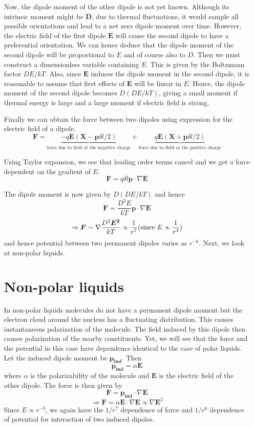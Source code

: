 \documentclass[11pt, letterpaper]{article}
\begin{document}
Now, the dipole moment of the other dipole is not yet known. Although its intrinsic moment might be $\bm{D}$, due to thermal fluctuations, it would sample all possible orientations and lead to a net zero dipole moment over time. However, the electric field of the first dipole $\bm{E}$ will cause the second dipole to have a preferential orientation. We can hence deduce that the dipole moment of the second dipole will be proportional to $E$ and of course also to $D$. Then we must construct a dimensionless variable containing $E$. This is given by the Boltzmann factor $DE/kT$. Also, since $\bm{E}$ induces the dipole moment in the second dipole, it is reasonable to assume that first effects of $\bm{E}$ will be linear in $E$. Hence, the dipole moment of the second dipole becomes $D(DE/kT)$, giving a small moment if thermal energy is large and a large moment if electric field is strong. 

Finally we can obtain the force between two dipoles using expression for the electric field of a dipole. 
$$
\bm{F} = \underbrace{-q\bm{E}(\bm{X} - \bm{p}\delta l /2)}_{\text{force due to field at the negative charge}} + \underbrace{q\bm{E}(\bm{X} + \bm{p}\delta l /2)}_{\text{force due to field at the positive charge}}
$$

Using Taylor expansion, we see that leading order terms cancel and we get a force dependent on the gradient of $E$. 
$$
\bm{F} = q\delta l \bm{p}\cdot\nabla\bm{E}
$$

The dipole moment is now given by  $D(DE/kT)$ and hence
$$
\bm{F} = \frac{D^2E}{kT} \bm{p}\cdot\nabla\bm{E}
$$
$$
\Rightarrow \bm{F} \sim  \nabla\frac{D^2\bm{E^2}}{kT} \propto \frac{1}{r^7} \text{(\hfill since $E\propto\frac{1}{r^3})$}
$$
and hence potential between two permanent dipoles varies as $r^{-6}$. Next, we look at non-polar liquids.

\section{Non-polar liquids}

In non-polar liquids molecules do not have a permanent dipole moment but the electron cloud around the nucleus has a fluctuating distribution. This causes instantaneous polarization of the molecule. The field induced by this dipole then causes polarization of the nearby constituents. Yet, we will see that the force and the potential in this case have dependence identical to the case of polar liquids. Let the induced dipole moment be $\bm{p_{ind}}$. Then
$$
\bm{p_{ind}} = \alpha \bm{E}
$$
where $\alpha$ is the polarizability of the molecule and $\bm{E}$ is the electric field of the other dipole. The force is then given by
$$
\bm{F} = \bm{p_{ind}}\cdot \nabla\bm{E}
$$
$$
\Rightarrow \bm{F} = \alpha \bm{E} \cdot \nabla\bm{E} \propto \nabla\bm{E}^2
$$
Since $E\propto r^{-3}$, we again have the $1/r^{7}$ dependence of force and $1/r^{6}$ dependence of potential for interaction of two induced dipoles.
\end{document}
